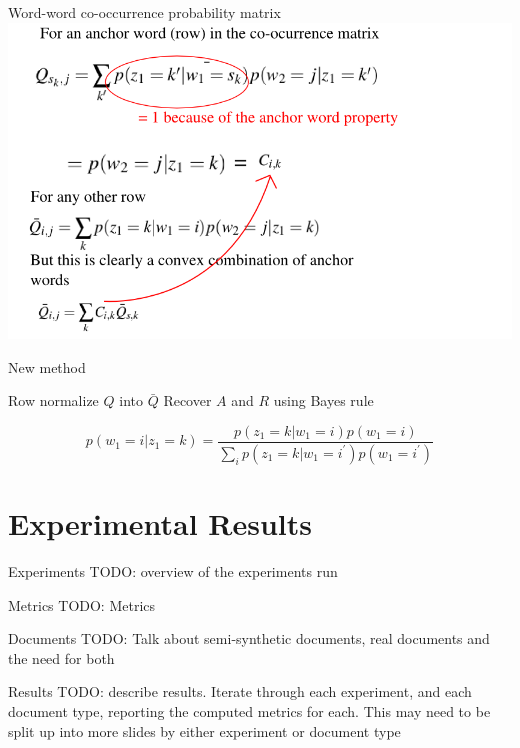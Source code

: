 \documentclass{lecture}
\begin{document}
\begin{plain}{Word-word co-occurrence probability matrix}
\includegraphics[scale=0.5]{figs/Q}
\end{plain}

\begin{plain}{New method}
\begin{itemize}
\p Row normalize $Q$ into $\bar{Q}$
\p Recover $A$ and $R$ using Bayes rule
\end{itemize}
$$p(w_1 = i | z_1 = k) = \frac{p(z_1 = k | w_1 = i)p(w_1 = i)}{\sum_i{p(z_1=k | w_1 = i^\prime)p(w_1=i^\prime)}}$$
\end{plain}

\section[Results]{Experimental Results}
\begin{plain}{Experiments}
TODO: overview of the experiments run
\end{plain}

\begin{plain}{Metrics}
TODO: Metrics
\end{plain}

\begin{plain}{Documents}
TODO: Talk about semi-synthetic documents, real documents and the need for both
\end{plain}

\begin{plain}{Results}
TODO: describe results. Iterate through each experiment, and each document type, reporting the computed metrics for each. This may need to be split up into more slides by either experiment or document type
\end{plain}
\end{document}
